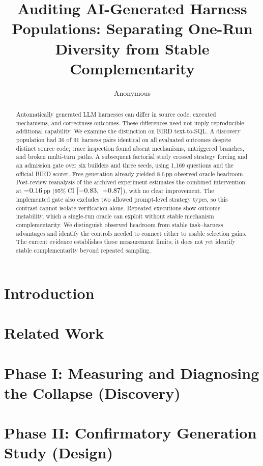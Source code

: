 \documentclass{article}
\title{Auditing AI-Generated Harness Populations: Separating One-Run Diversity from Stable Complementarity}
\author{Anonymous}
\begin{document}
\maketitle

\begin{abstract}
Automatically generated LLM harnesses can differ in source code, executed
mechanisms, and correctness outcomes. These differences need not imply
reproducible additional capability. We examine the distinction on BIRD
text-to-SQL. A discovery population had 36 of 91 harness pairs identical on
all evaluated outcomes despite distinct source code; trace inspection found
absent mechanisms, untriggered branches, and broken multi-turn paths.
A subsequent factorial study crossed strategy forcing and an admission gate
over six builders and three seeds, using 1{,}169 questions and the official
BIRD scorer. Free generation already yielded 8.6\,pp observed oracle
headroom. Post-review reanalysis of the archived experiment estimates the
combined intervention at $-0.16$\,pp (95\% CI
$[-0.83,\ +0.87]$), with no clear improvement. The implemented gate
also excludes two allowed prompt-level strategy types, so this contrast
cannot isolate verification alone. Repeated executions show outcome
instability, which a single-run oracle can exploit without stable mechanism
complementarity. We distinguish observed headroom from stable task--harness
advantages and identify the controls needed to connect either to usable
selection gains. The current evidence establishes these measurement limits;
it does not yet identify stable complementarity beyond repeated sampling.
\end{abstract}

\section{Introduction}\label{sec:introduction}


\section{Related Work}\label{sec:related}


\section{Phase I: Measuring and Diagnosing the Collapse (Discovery)}\label{sec:phase1}


\section{Phase II: Confirmatory Generation Study (Design)}\label{sec:phase2}

\end{document}
